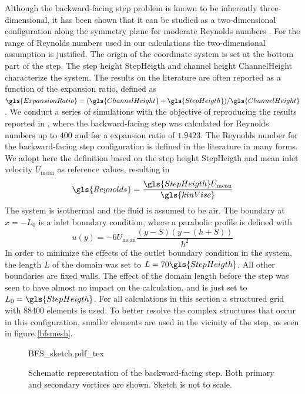 Although the backward-facing step problem is known to be inherently three-dimensional, it has been shown that it can be studied as a two-dimensional configuration along the symmetry plane for moderate Reynolds numbers \citep{barkleyThreedimensionalInstabilityFlow2000, biswasBackwardFacingStepFlows2004}. For the range of Reynolds numbers used in our calculations the two-dimensional assumption is justified.  The origin of the coordinate system is set at the bottom part of the step. The step height \gls{StepHeigth} and channel height \gls{ChannelHeight} characterize the system. The results on the literature are often reported as a function of the expansion ratio, defined as $\gls{ExpansionRatio} = (\gls{ChannelHeight}+\gls{StepHeigth})/\gls{ChannelHeight}$. 
We conduct a series of simulations with the objective of reproducing the results reported in \cite{biswasBackwardFacingStepFlows2004}, where the backward-facing step was calculated for Reynolds numbers up to $400$ and for a expansion ratio of $1.9423$. 
The Reynolds number for the backward-facing step configuration is defined in the literature in many forms. We adopt here the definition based on the step height \gls{StepHeigth} and mean inlet velocity $U_{\text{mean}}$ as reference values, resulting in
\begin{equation}
\gls{Reynolds}= \frac{\gls{StepHeigth}U_{\text{mean}}}{\gls{kinVisc}}
\end{equation} 
The system is isothermal and the fluid is assumed to be air. The boundary at $ x = -L_0$ is a inlet boundary condition, where a parabolic profile is defined with %
\begin{equation}
u(y) = -6U_{\text{mean}}\frac{(y-S)(y-(h+S))}{h^2}
\end{equation}
In order to minimize the effects of the outlet  boundary condition in the system, the length $L$ of the domain was set to $L = 70 \gls{StepHeigth}$. All other boundaries are fixed walls. The effect of the domain length before the step was seen to have almost no impact on the calculation, and is just set to $L_0 = \gls{StepHeigth}$. For all calculations in this section a structured grid with 88400 elements is used. To better resolve the complex structures that occur in this configuration, smaller elements are used in the vicinity of the step, as seen in figure \cref{bfsmesh}.

\begin{figure}[tb]
	\begin{center}
		\def\svgwidth{0.9\textwidth}
		{BFS_sketch.pdf_tex}		
		\caption{Schematic representation of the backward-facing step. Both primary and secondary vortices are shown. Sketch is not to scale.}
		\label{BFSsketch}
	\end{center}	
\end{figure} 

